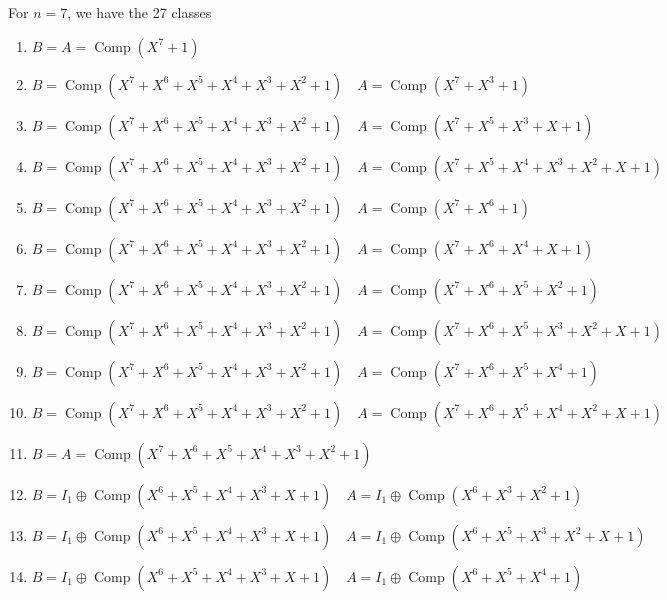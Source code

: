 \documentclass[10pt]{article}
\begin{document}
For $n=7$, we have the 27 classes

\begin{enumerate}
  \item $B=A=\operatorname{Comp}\left(X^{7}+1\right)$
  \item $B=\operatorname{Comp}\left(X^{7}+X^{6}+X^{5}+X^{4}+X^{3}+X^{2}+1\right) \quad A=\operatorname{Comp}\left(X^{7}+X^{3}+1\right)$
  \item $B=\operatorname{Comp}\left(X^{7}+X^{6}+X^{5}+X^{4}+X^{3}+X^{2}+1\right) \quad A=\operatorname{Comp}\left(X^{7}+X^{5}+X^{3}+X+1\right)$
  \item $B=\operatorname{Comp}\left(X^{7}+X^{6}+X^{5}+X^{4}+X^{3}+X^{2}+1\right) \quad A=\operatorname{Comp}\left(X^{7}+X^{5}+X^{4}+\right. \left.X^{3}+X^{2}+X+1\right)$
  \item $B=\operatorname{Comp}\left(X^{7}+X^{6}+X^{5}+X^{4}+X^{3}+X^{2}+1\right) \quad A=\operatorname{Comp}\left(X^{7}+X^{6}+1\right)$
  \item $B=\operatorname{Comp}\left(X^{7}+X^{6}+X^{5}+X^{4}+X^{3}+X^{2}+1\right) \quad A=\operatorname{Comp}\left(X^{7}+X^{6}+X^{4}+X+1\right)$
  \item $B=\operatorname{Comp}\left(X^{7}+X^{6}+X^{5}+X^{4}+X^{3}+X^{2}+1\right) \quad A=\operatorname{Comp}\left(X^{7}+X^{6}+X^{5}+X^{2}+1\right)$
  \item $B=\operatorname{Comp}\left(X^{7}+X^{6}+X^{5}+X^{4}+X^{3}+X^{2}+1\right) \quad A=\operatorname{Comp}\left(X^{7}+X^{6}+X^{5}+\right. \left.X^{3}+X^{2}+X+1\right)$
  \item $B=\operatorname{Comp}\left(X^{7}+X^{6}+X^{5}+X^{4}+X^{3}+X^{2}+1\right) \quad A=\operatorname{Comp}\left(X^{7}+X^{6}+X^{5}+X^{4}+1\right)$
  \item $B=\operatorname{Comp}\left(X^{7}+X^{6}+X^{5}+X^{4}+X^{3}+X^{2}+1\right) \quad A=\operatorname{Comp}\left(X^{7}+X^{6}+X^{5}+\right. \left.X^{4}+X^{2}+X+1\right)$
  \item $B=A=\operatorname{Comp}\left(X^{7}+X^{6}+X^{5}+X^{4}+X^{3}+X^{2}+1\right)$
  \item $B=I_{1} \oplus \operatorname{Comp}\left(X^{6}+X^{5}+X^{4}+X^{3}+X+1\right) \quad A=I_{1} \oplus \operatorname{Comp}\left(X^{6}+X^{3}+X^{2}+1\right)$
  \item $B=I_{1} \oplus \operatorname{Comp}\left(X^{6}+X^{5}+X^{4}+X^{3}+X+1\right) \quad A=I_{1} \oplus \operatorname{Comp}\left(X^{6}+X^{5}+X^{3}+\right. \left.X^{2}+X+1\right)$
  \item $B=I_{1} \oplus \operatorname{Comp}\left(X^{6}+X^{5}+X^{4}+X^{3}+X+1\right) \quad A=I_{1} \oplus \operatorname{Comp}\left(X^{6}+X^{5}+X^{4}+1\right)$

\end{enumerate}
\end{document}
